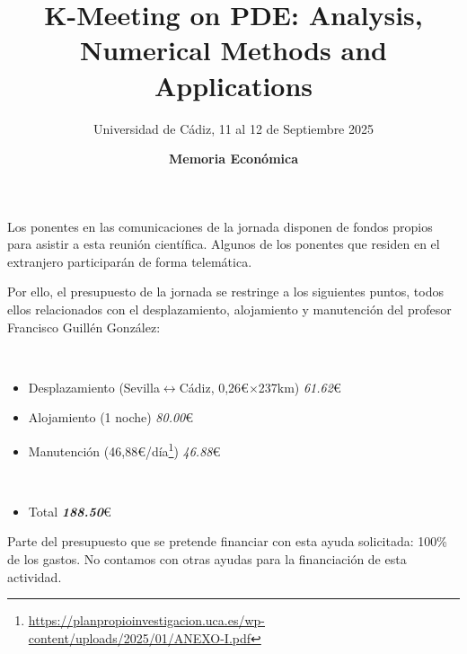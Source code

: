 \documentclass[12pt,a4paper]{article}
\title{K-Meeting on PDE: Analysis, Numerical Methods and Applications}
\date{\bf Memoria Económica}
\author{Universidad de Cádiz, {11 al 12 de Septiembre 2025}}
\begin{document}
\maketitle

Los ponentes en las comunicaciones de la jornada disponen de fondos propios para asistir a esta reunión científica. Algunos de los ponentes que residen en el extranjero participarán de forma telemática.

Por ello, el presupuesto de la jornada se restringe a los siguientes puntos, todos ellos relacionados con el desplazamiento, alojamiento y manutención del profesor Francisco Guillén González:

\par ~\smallskip~

\begin{itemize}
	\item
	      Desplazamiento (Sevilla$\leftrightarrow$Cádiz, 0,26€$\times$237km) \dotfill \textit{61.62}€
	\item
	      Alojamiento (1 noche) \dotfill \textit{80.00}€
	\item
	      Manutención (46,88€/día\footnote{\url{https://planpropioinvestigacion.uca.es/wp-content/uploads/2025/01/ANEXO-I.pdf}}) \dotfill \textit{46.88}€
	      \par ~\smallskip~
	\item
	      Total \dotfill \textbf{\textit{188.50}}€
\end{itemize}
Parte del presupuesto que se pretende financiar con esta ayuda solicitada: 100\% de los gastos.
No contamos con otras ayudas para la financiación de esta actividad.
\end{document}
